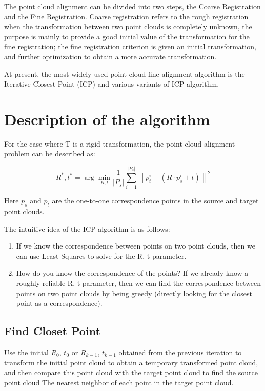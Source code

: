 \documentclass{article} %
\begin{document}
The point cloud alignment can be divided into two steps, the Coarse Registration and the Fine Registration. Coarse registration refers to the rough registration when the transformation between two point clouds is completely unknown, the purpose is mainly to provide a good initial value of the transformation for the fine registration; the fine registration criterion is given an initial transformation, and further optimization to obtain a more accurate transformation.

At present, the most widely used point cloud fine alignment algorithm is the Iterative Closest Point (ICP) and various variants of ICP algorithm.

\section{Description of the algorithm}
For the case where T is a rigid transformation, the point cloud alignment problem can be described as:

\begin{equation}
	R^{*}, t^{*}=\arg \min _{R, t}  \frac{1}{\left|P_{s}\right|} \sum_{i=1}^{\mid P_{s}|}\left\|p_{t}^{i}-\left(R \cdot p_{s}^{i}+t\right)\right\|^{2}
\end{equation}

Here $p_s$ and $p_t$ are the one-to-one correspondence points in the source and target point clouds.

The intuitive idea of the ICP algorithm is as follows:
\begin{enumerate}
	\item If we know the correspondence between points on two point clouds, then we can use Least Squares to solve for the R, t parameter.
	\item How do you know the correspondence of the points? If we already know a roughly reliable R, t parameter, then we can find the correspondence between points on two point clouds by being greedy (directly looking for the closest point as a correspondence).
\end{enumerate}

\subsection{Find Closet Point}
Use the initial $R_0$, $t_0$ or $R_{k-1}$, $t_{k-1}$ obtained from the previous iteration to transform the initial point cloud to obtain a temporary transformed point cloud, and then compare this point cloud with the target point cloud to find the source point cloud The nearest neighbor of each point in the target point cloud.
\end{document}
